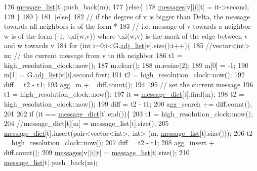 \begin{DoxyCode}
176             \hyperlink{classgraph__message_aa17fdb629b423343edfafa97252763ef}{message\_list}[t].push\_back(m);
177           \}\textcolor{keywordflow}{else}\{
178             \hyperlink{classgraph__message_aac77e098f0acf9650116a8e51fe3b4b7}{messages}[v][i][t] = it->second;
179           \}
180         \}
181       \}\textcolor{keywordflow}{else}\{
182         \textcolor{comment}{// if the degree of v is bigger than Delta, the message towards all neighbors is of the form *}
183         \textcolor{comment}{// i.e. message of v towards a neighbor w is of the form (-1, \(\backslash\)xi(w,v)) where \(\backslash\)xi(w,v) is the mark
       of the edge between v and w towards v}
184         \textcolor{keywordflow}{for} (\textcolor{keywordtype}{int} i=0;i<G.\hyperlink{classmarked__graph_a1a0bf7ca413a278763f7c878b3b6fd6f}{adj\_list}[v].size();i++)\{
185           \textcolor{comment}{//vector<int> m; // the current message from v to ith neighbor}
186           t1 = high\_resolution\_clock::now();
187           m.clear();
188           m.resize(2);
189           m[0] = -1;
190           m[1] = G.\hyperlink{classmarked__graph_a1a0bf7ca413a278763f7c878b3b6fd6f}{adj\_list}[v][i].second.first;
191           t2 = high\_resolution\_clock::now();
192           diff = t2 - t1;
193           agg\_m += diff.count();
194 
195           \textcolor{comment}{// set the current message}
196           t1 = high\_resolution\_clock::now();
197           it = \hyperlink{classgraph__message_ab54d89b122c2b1322da0d5db2043fb84}{message\_dict}[t].find(m);
198           t2 = high\_resolution\_clock::now();
199           diff = t2 - t1;
200           agg\_search += diff.count();
201 
202           \textcolor{keywordflow}{if} (it == \hyperlink{classgraph__message_ab54d89b122c2b1322da0d5db2043fb84}{message\_dict}[t].end())\{
203             t1 = high\_resolution\_clock::now();
204             \textcolor{comment}{//message\_dict[t][m] = message\_list[t].size();}
205             \hyperlink{classgraph__message_ab54d89b122c2b1322da0d5db2043fb84}{message\_dict}[t].insert(pair<vector<int>, \textcolor{keywordtype}{int}> (m, 
      \hyperlink{classgraph__message_aa17fdb629b423343edfafa97252763ef}{message\_list}[t].size()));
206             t2 = high\_resolution\_clock::now();
207             diff = t2 - t1;
208             agg\_insert += diff.count();
209             \hyperlink{classgraph__message_aac77e098f0acf9650116a8e51fe3b4b7}{messages}[v][i][t] = \hyperlink{classgraph__message_aa17fdb629b423343edfafa97252763ef}{message\_list}[t].size();
210             \hyperlink{classgraph__message_aa17fdb629b423343edfafa97252763ef}{message\_list}[t].push\_back(m);

\end{DoxyCode}
